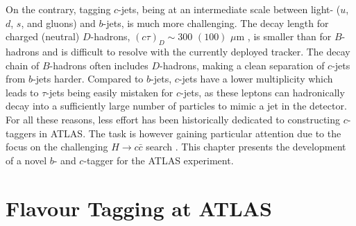 On the contrary, tagging $c$-jets, being at an intermediate scale between light- ($u$, $d$, $s$, and gluons) and $b$-jets, is much more challenging. The decay length for charged (neutral) $D$-hadrons, $(c\tau)_D \sim 300$ $(100)$ $\mu$m \cite{Tanabashi:2018oca}, is smaller than for $B$-hadrons and is difficult to resolve with the currently deployed tracker. The decay chain of $B$-hadrons often includes $D$-hadrons, making a clean separation of $c$-jets from $b$-jets harder. Compared to $b$-jets, $c$-jets have a lower multiplicity which leads to $\tau$-jets being easily mistaken for $c$-jets, as these leptons can hadronically decay into a sufficiently large number of particles to mimic a jet in the detector. For all these reasons, less effort has been historically dedicated to constructing $c$-taggers in ATLAS. The task is however gaining particular attention due to the focus on the challenging $H \rightarrow c\bar{c}$ search \cite{Aaboud:2018fhh}. This chapter presents the development of a novel $b$- and $c$-tagger for the ATLAS experiment.

\section{Flavour Tagging at ATLAS}

